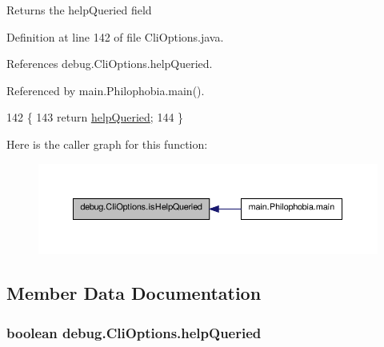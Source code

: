 \begin{DoxyReturn}{Returns}
the help\-Queried field 
\end{DoxyReturn}


Definition at line 142 of file Cli\-Options.\-java.



References debug.\-Cli\-Options.\-help\-Queried.



Referenced by main.\-Philophobia.\-main().


\begin{DoxyCode}
142                                    \{
143         \textcolor{keywordflow}{return} \hyperlink{classdebug_1_1_cli_options_a226c64b5f481ade53599280070c24cf0}{helpQueried};
144     \}
\end{DoxyCode}


Here is the caller graph for this function\-:\nopagebreak
\begin{figure}[H]
\begin{center}
\leavevmode
\includegraphics[width=350pt]{classdebug_1_1_cli_options_a34dabb4bbc667b0f56bf210749c260bf_icgraph}
\end{center}
\end{figure}




\subsection{Member Data Documentation}
\hypertarget{classdebug_1_1_cli_options_a226c64b5f481ade53599280070c24cf0}{
\subsubsection[{help\-Queried}]{\setlength{\rightskip}{0pt plus 5cm}boolean debug.\-Cli\-Options.\-help\-Queried\hspace{0.3cm}{\ttfamily [protected]}}}\label{classdebug_1_1_cli_options_a226c64b5f481ade53599280070c24cf0}


